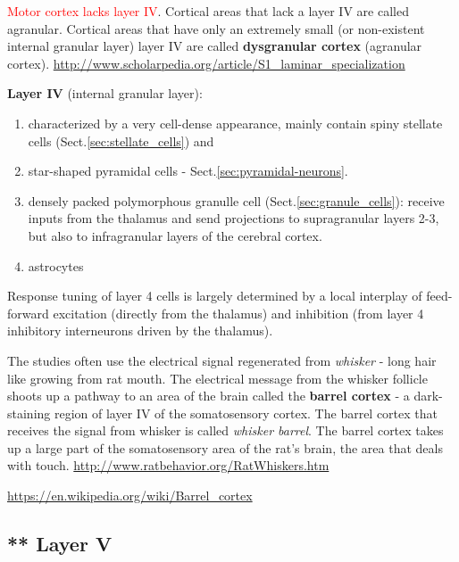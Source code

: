 \textcolor{red}{Motor cortex lacks layer IV}. Cortical
  areas that lack a layer IV are called agranular. Cortical areas that have only
  an extremely small (or non-existent internal granular layer) layer
  IV are called {\bf dysgranular cortex} (agranular cortex).
\url{http://www.scholarpedia.org/article/S1_laminar_specialization}

{\bf Layer IV} (internal granular layer): 
\begin{enumerate}
  \item characterized by a very cell-dense appearance, mainly contain spiny
  stellate cells (Sect.\ref{sec:stellate_cells}) and 
  
  \item star-shaped pyramidal cells - Sect.\ref{sec:pyramidal-neurons}.
  
  \item densely packed polymorphous granulle cell
  (Sect.\ref{sec:granule_cells}):
  receive inputs from the thalamus and send projections to supragranular layers 2-3, but
  also to infragranular layers of the cerebral cortex.
  \item astrocytes
\end{enumerate}

Response tuning of layer 4 cells is largely determined by a local interplay of
feed-forward excitation (directly from the thalamus) and inhibition (from layer
4 inhibitory interneurons driven by the thalamus).

\begin{mdframed}

The studies often use the electrical signal regenerated from {\it whisker} -
long hair like growing from rat mouth.
The electrical message from the whisker follicle shoots up a pathway to an area
of the brain called the {\bf barrel cortex} - a dark-staining region of layer
IV of the somatosensory cortex. The barrel cortex that receives the signal
from whisker is called {\it whisker barrel}. The barrel cortex takes up a large
part of the somatosensory area of the rat's brain, the area that deals with touch.
\url{http://www.ratbehavior.org/RatWhiskers.htm}

\url{https://en.wikipedia.org/wiki/Barrel_cortex}
\end{mdframed}  



\subsection{** Layer V}
\label{sec:layer-V}


